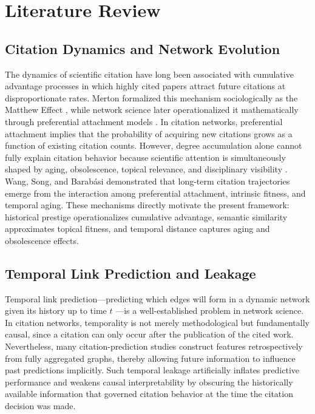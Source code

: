 \documentclass[11pt,a4paper]{article}
\begin{document}
\section{Literature Review}
\label{sec:lit}

\subsection{Citation Dynamics and Network Evolution}

The dynamics of scientific citation have long been associated with cumulative advantage processes in which highly cited papers attract future citations at disproportionate rates. Merton formalized this mechanism sociologically as the Matthew Effect \citep{merton1968matthew}, while network science later operationalized it mathematically through preferential attachment models \citep{barabasi1999emergence}. In citation networks, preferential attachment implies that the probability of acquiring new citations grows as a function of existing citation counts. However, degree accumulation alone cannot fully explain citation behavior because scientific attention is simultaneously shaped by aging, obsolescence, topical relevance, and disciplinary visibility \citep{price1965networks}. Wang, Song, and Barab\'asi \citep{wang2013quantifying} demonstrated that long-term citation trajectories emerge from the interaction among preferential attachment, intrinsic fitness, and temporal aging. These mechanisms directly motivate the present framework: historical prestige operationalizes cumulative advantage, semantic similarity approximates topical fitness, and temporal distance captures aging and obsolescence effects.

\subsection{Temporal Link Prediction and Leakage}

Temporal link prediction---predicting which edges will form in a dynamic network given its history up to time \(t\) \citep{liben2007link}---is a well-established problem in network science. In citation networks, temporality is not merely methodological but fundamentally causal, since a citation can only occur after the publication of the cited work. Nevertheless, many citation-prediction studies construct features retrospectively from fully aggregated graphs, thereby allowing future information to influence past predictions implicitly. Such temporal leakage artificially inflates predictive performance and weakens causal interpretability by obscuring the historically available information that governed citation behavior at the time the citation decision was made.
\end{document}
